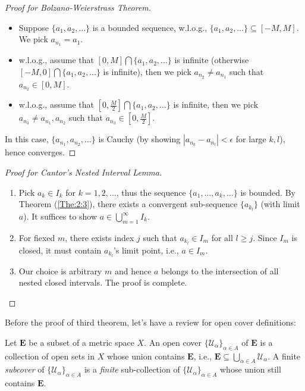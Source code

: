 \begin{proof}[Proof for Bolzano-Weierstrass Theorem]
\quad

\begin{itemize}
\item
Suppose $\{a_1,a_2,\dots\}$ is a bounded sequence, w.l.o.g., $\{a_1,a_2,\dots\}\subseteq[-M,M]$. We pick $a_{n_1} = a_1$.
\item
w.l.o.g., assume that $[0,M]\bigcap\{a_1,a_2,\dots\}$ is infinite (otherwise $[-M,0]\bigcap\{a_1,a_2,\dots\}$ is infinite), then we pick $a_{n_2}\ne a_{n_1}$ such that $a_{n_2}\in[0,M]$.
\item
w.l.o.g., assume that $[0,\frac{M}{2}]\bigcap\{a_1,a_2,\dots\}$ is infinite, then we pick $a_{n_3}\ne a_{n_1},a_{n_2}$ such that $a_{n_3}\in[0,\frac{M}{2}]$.
\end{itemize}
In this case, $\{a_{n_1},a_{n_2},\dots\}$ is Cauchy (by showing $|a_{n_k}-a_{n_l}|<\epsilon$ for large $k,l$), hence converges.
\end{proof}
\begin{proof}[Proof for Cantor's Nested Interval Lemma]\quad

\begin{enumerate}
\item
Pick $a_k\in I_k$ for $k=1,2,\dots$, thus the sequence $\{a_1,\dots,a_k,\dots\}$ is bounded. By Theorem (\ref{The:2:3}), there exists a convergent sub-sequence $\{a_{k_l}\}$ (with limit $a$). It suffices to show $a\in\bigcup_{m=1}^\infty I_k$. 
\item
For fiexed $m$, there exists index $j$ such that $a_{k_l}\in I_m$ for all $l\ge j$. Since $I_m$ is closed, it must contain $a_{k_l}$'s limit point, i.e., $a\in I_m$.
\item
Our choice is arbitrary $m$ and hence $a$ belongs to the intersection of all nested closed intervals. The proof is complete.
\end{enumerate}

\end{proof}
Before the proof of third theorem, let's have a review for open cover definitions:
\begin{definition}
Let $\bm E$ be a subset of a metric space $X$. An open cover $\{\mathcal{U}_\alpha\}_{\alpha\in A}$ of $\bm E$ is a collection of open sets in $X$ whose union contains $\bm E$, i.e., $\bm E\subseteq\bigcup_{\alpha\in A}\mathcal{U}_\alpha$. A finite \emph{subcover} of $\{\mathcal{U}_\alpha\}_{\alpha\in A}$ is a \emph{finite} sub-collection of $\{\mathcal{U}_\alpha\}_{\alpha\in A}$ whose union still contains $\bm E$.
\end{definition}
